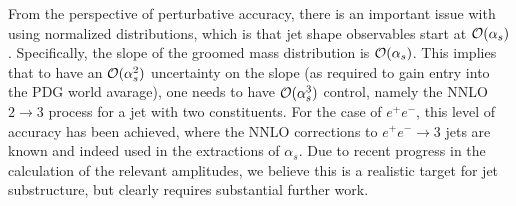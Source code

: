 From the perspective of perturbative accuracy, there is an important issue with using normalized distributions, which is that jet shape observables start at ${\mathcal O}(\alpha_s)$.
%
Specifically, the slope of the groomed mass distribution is ${\mathcal O}(\alpha_s)$.
%
This implies that to have an ${\mathcal O}(\alpha_s^2)$ uncertainty on the slope (as required to gain entry into the PDG world avarage), one needs to have ${\mathcal O}(\alpha_s^3)$ control, namely the NNLO $2 \to 3$ process for a jet with two constituents.
%
For the case of $e^+e^-$, this level of accuracy has been achieved, where the NNLO corrections to $e^+e^-\to 3$ jets are known and indeed used in the extractions of $\alpha_s$.
%
Due to recent progress in the calculation of the relevant amplitudes, we believe this is a realistic target for jet substructure, but clearly requires substantial further work.

































